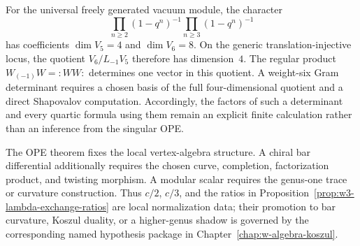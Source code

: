 \begin{remark}
\label{rem:w3-weight-six-interface}
For the universal freely generated vacuum module, the character
\[
\prod_{n\ge2}(1-q^n)^{-1}\prod_{n\ge3}(1-q^n)^{-1}
\]
has coefficients $\dim V_5=4$ and $\dim V_6=8$.  On the generic
translation-injective locus, the quotient
$V_6/L_{-1}V_5$ therefore has dimension~$4$.  The regular product
$W_{(-1)}W={:}WW{:}$ determines one vector in this quotient.  A
weight-six Gram determinant requires a chosen basis of the full
four-dimensional quotient and a direct Shapovalov computation.
Accordingly, the factors of such a determinant and every quartic
formula using them remain an explicit finite calculation rather than
an inference from the singular OPE.
\end{remark}

\begin{remark}
\label{rem:regular-term-bar}
The OPE theorem fixes the local vertex-algebra structure.  A chiral
bar differential additionally requires the chosen curve, completion,
factorization product, and twisting morphism.  A modular scalar
requires the genus-one trace or curvature construction.  Thus
$c/2$, $c/3$, and the ratios in
Proposition~\ref{prop:w3-lambda-exchange-ratios} are local
normalization data; their promotion to bar curvature, Koszul duality,
or a higher-genus shadow is governed by the corresponding named
hypothesis package in Chapter~\ref{chap:w-algebra-koszul}.
\end{remark}
